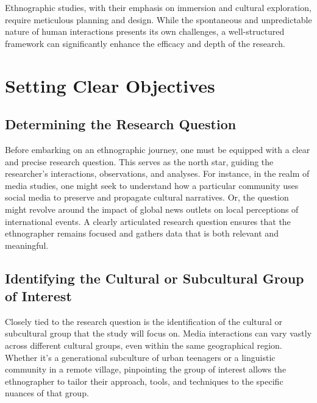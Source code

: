 \documentclass[
  b5paper]{book}
\begin{document}
Ethnographic studies, with their emphasis on immersion and cultural exploration, require meticulous planning and design. While the spontaneous and unpredictable nature of human interactions presents its own challenges, a well-structured framework can significantly enhance the efficacy and depth of the research.

\hypertarget{setting-clear-objectives-1}{%
\section{Setting Clear Objectives}\label{setting-clear-objectives-1}}

\hypertarget{determining-the-research-question}{%
\subsection*{Determining the Research Question}\label{determining-the-research-question}}

Before embarking on an ethnographic journey, one must be equipped with a clear and precise research question. This serves as the north star, guiding the researcher's interactions, observations, and analyses. For instance, in the realm of media studies, one might seek to understand how a particular community uses social media to preserve and propagate cultural narratives. Or, the question might revolve around the impact of global news outlets on local perceptions of international events. A clearly articulated research question ensures that the ethnographer remains focused and gathers data that is both relevant and meaningful.

\hypertarget{identifying-the-cultural-or-subcultural-group-of-interest}{%
\subsection*{Identifying the Cultural or Subcultural Group of Interest}\label{identifying-the-cultural-or-subcultural-group-of-interest}}

Closely tied to the research question is the identification of the cultural or subcultural group that the study will focus on. Media interactions can vary vastly across different cultural groups, even within the same geographical region. Whether it's a generational subculture of urban teenagers or a linguistic community in a remote village, pinpointing the group of interest allows the ethnographer to tailor their approach, tools, and techniques to the specific nuances of that group.
\end{document}
